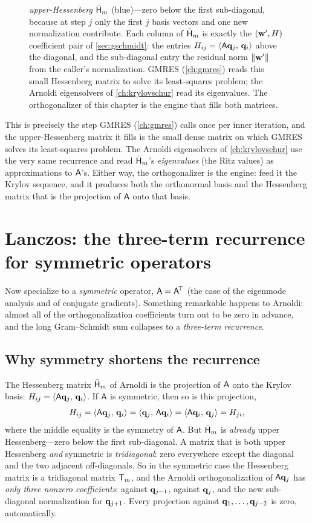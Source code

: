 \begin{figure}[t]
{\emph{upper-Hessenberg} $\bar{\mathsf{H}}_m$ (blue)---zero below the first sub-diagonal,
because at step $j$ only the first $j$ basis vectors and one new normalization
contribute. Each column of $\bar{\mathsf{H}}_m$ is exactly the $(\mathbf{w}', H)$ coefficient
pair of \cref{sec:gschmidt}: the entries $H_{ij}=\left\langle \mathsf{A}\mathbf{q}_j,\, \mathbf{q}_i\right\rangle$ above
the diagonal, and the sub-diagonal entry the residual norm $\lVert\mathbf{w}'\rVert$ from the
caller's normalization. GMRES (\cref{ch:gmres}) reads this small Hessenberg matrix to
solve its least-squares problem; the Arnoldi eigensolvers of \cref{ch:krylovschur}
read its eigenvalues. The orthogonalizer of this chapter is the engine that fills
both matrices.}
\label{fig:arnoldi}
\end{figure}

This is precisely the  step GMRES (\cref{ch:gmres}) calls once
per inner iteration, and the upper-Hessenberg matrix it fills is the small dense
matrix on which GMRES solves its least-squares problem. The Arnoldi eigensolvers of
\cref{ch:krylovschur} use the very same recurrence and read $\bar{\mathsf{H}}_m$'s
\emph{eigenvalues} (the Ritz values) as approximations to $\mathsf{A}$'s. Either way,
the orthogonalizer is the engine: feed it the Krylov sequence, and it produces both
the orthonormal basis and the Hessenberg matrix that is the projection of $\mathsf{A}$
onto that basis.

\section{Lanczos: the three-term recurrence for symmetric operators}
\label{sec:lanczos}

Now specialize to a \emph{symmetric} operator, $\mathsf{A} = \mathsf{A}^{\!\top}$ (the case
of the eigenmode analysis and of conjugate gradients). Something remarkable happens
to Arnoldi: almost all of the orthogonalization coefficients turn out to be zero in
advance, and the long Gram--Schmidt sum collapses to a \emph{three-term recurrence}.

\subsection{Why symmetry shortens the recurrence}

The Hessenberg matrix $\bar{\mathsf{H}}_m$ of Arnoldi is the projection of $\mathsf{A}$ onto
the Krylov basis: $H_{ij} = \left\langle \mathsf{A}\mathbf{q}_j,\, \mathbf{q}_i\right\rangle$. If $\mathsf{A}$ is symmetric,
then so is this projection,
\[
  H_{ij} = \left\langle \mathsf{A}\mathbf{q}_j,\, \mathbf{q}_i\right\rangle = \left\langle \mathbf{q}_j,\, \mathsf{A}\mathbf{q}_i\right\rangle
         = \left\langle \mathsf{A}\mathbf{q}_i,\, \mathbf{q}_j\right\rangle = H_{ji},
\]
where the middle equality is the symmetry of $\mathsf{A}$. But $\bar{\mathsf{H}}_m$ is
\emph{already} upper Hessenberg---zero below the first sub-diagonal. A matrix that is
both upper Hessenberg \emph{and} symmetric is \emph{tridiagonal}: zero everywhere
except the diagonal and the two adjacent off-diagonals. So in the symmetric case the
Hessenberg matrix is a tridiagonal matrix $\mathsf{T}_m$, and the Arnoldi
orthogonalization of $\mathsf{A}\mathbf{q}_j$ has \emph{only three nonzero coefficients}: against
$\mathbf{q}_{j-1}$, against $\mathbf{q}_j$, and the new sub-diagonal normalization for $\mathbf{q}_{j+1}$.
Every projection against $\mathbf{q}_1,\dots,\mathbf{q}_{j-2}$ is zero, automatically.


